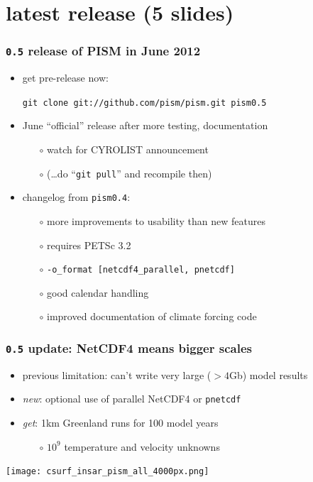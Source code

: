 \documentclass[hide notes,intlimits]{beamer}
\begin{document}
\section[latest release]{latest release  (5 slides)}

\begin{frame}
  \frametitle{\texttt{0.5} release of PISM in June 2012}

  \begin{itemize}
  \item get pre-release \alert{now}:
    \begin{center}
    \texttt{git clone git://github.com/pism/pism.git pism0.5}
    \end{center}
  \item June ``official'' release after more testing, documentation
    \begin{itemize}
    \item[$\circ$] watch for CYROLIST announcement
    \item[$\circ$] (\dots do ``\texttt{git pull}'' and recompile then)
    \end{itemize}
  \item changelog from \texttt{pism0.4}:
    \begin{itemize}
    \item[$\circ$] more improvements to usability than new features
    \item[$\circ$] requires PETSc 3.2
    \item[$\circ$] \texttt{-o\_format [netcdf4\_parallel, pnetcdf]}
    \item[$\circ$] good calendar handling
    \item[$\circ$] improved documentation of climate forcing code
    \end{itemize}
  \end{itemize}
\end{frame}


\begin{frame}
  \frametitle{\texttt{0.5} update: NetCDF4 means bigger scales}

\vspace{-1mm}
  \begin{itemize}
  \item previous limitation: can't write very large ($>4$Gb) model results
  \item \emph{new}: optional use of parallel NetCDF4 or \texttt{pnetcdf}
  \item \emph{get}: 1km Greenland runs for 100 model years
    \scriptsize
    \begin{itemize}
    \item[$\circ$] $10^9$ temperature and velocity unknowns
    \end{itemize}
    \normalsize
  \end{itemize}
  
    \vspace{-2mm}
    \begin{center}
    \texttt{[image: csurf\_insar\_pism\_all\_4000px.png]}
    \end{center}
\end{frame}
\end{document}
